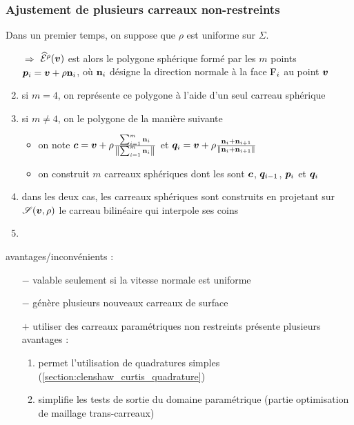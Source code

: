 

\subsubsection{Ajustement de plusieurs carreaux non-restreints}%
\label{section:quadrangulation_polygone_spherique}
Dans un premier temps, on suppose que $\rho$ est uniforme sur $\Sigma$. 

\begin{enumerate}
	\item[$\Rightarrow$] $\widehat{\mathcal{E}}^{\rho}({\bm{v}})$ est alors le polygone sphérique formé par les $m$ points $\bm{p}_i = \bm{v} + \rho \mathbf{n}_i$, où $\mathbf{n}_i$ désigne la direction normale à la face $\mathrm{F}_i$ au point $\bm{v}$
	\item si $m = 4$, on représente ce polygone à l'aide d'un seul carreau sphérique
	\item si $m \neq 4$, on  le polygone de la manière suivante 
	\begin{itemize}
		\item on note $\bm{c} = \bm{v} + \rho \frac{\sum_{i=1}^m \mathbf{n}_i}{\left\| {\sum_{i=1}^m \mathbf{n}_i} \right\|}$ et $\bm{q}_i = \bm{v} + \rho \frac{\mathbf{n}_i + \mathbf{n}_{i+1}}{\left\| {\mathbf{n}_i + \mathbf{n}_{i+1}} \right\|}$
		\item on construit $m$ carreaux sphériques dont les  sont $\bm{c}$, $\bm{q}_{i-1}$, $\bm{p}_i$ et $\bm{q}_i$
	\end{itemize}
	\item dans les deux cas, les carreaux sphériques sont construits en projetant sur $\sphere[\v][\rho]$ le carreau bilinéaire qui interpole ses coins
	
	\item 
\end{enumerate}






avantages/inconvénients :
\begin{itemize}
	\item[$-$] valable seulement si la vitesse normale est uniforme
	\item[$-$] génère plusieurs nouveaux carreaux de surface
	\item[$+$] utiliser des carreaux paramétriques non restreints présente plusieurs avantages :
	\begin{enumerate}
		\item permet l'utilisation de quadratures simples (\cf \autoref{section:clenshaw_curtis_quadrature})
		\item simplifie les tests de sortie du domaine paramétrique (\cf partie optimisation de maillage trans-carreaux)
	\end{enumerate}
\end{itemize}


